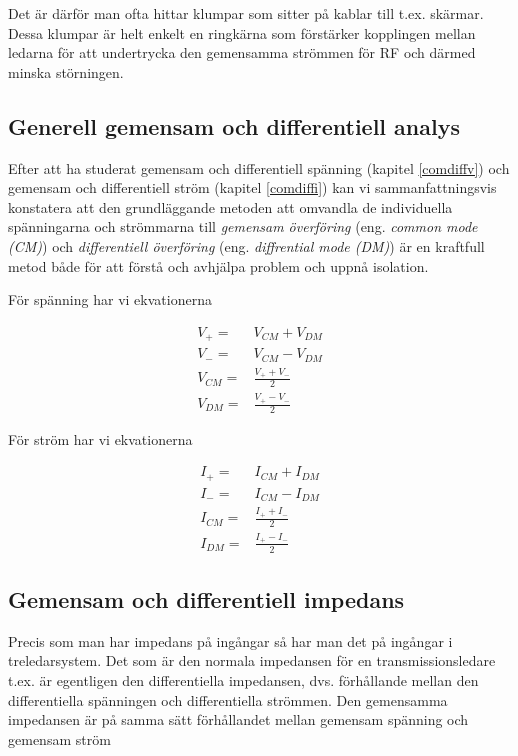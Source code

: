 Det är därför man ofta hittar klumpar som sitter
på kablar till t.ex. skärmar. Dessa klumpar är helt enkelt en ringkärna som
förstärker kopplingen mellan ledarna för att undertrycka den gemensamma strömmen
för RF och därmed minska störningen.

\subsection{Generell gemensam och differentiell analys}
\label{comdiffgeneric}

Efter att ha studerat gemensam och differentiell spänning (kapitel \ref{comdiffv})
och gemensam och differentiell ström (kapitel \ref{comdiffi}) kan vi
sammanfattningsvis konstatera att den grundläggande metoden att omvandla
de individuella spänningarna och strömmarna till \emph{gemensam överföring}
(eng. \emph{common mode (CM)}) och \emph{differentiell överföring}
(eng. \emph{diffrential mode (DM)}) är en kraftfull metod både för att
förstå och avhjälpa problem och uppnå isolation.

För spänning har vi ekvationerna

\begin{eqnarray}
V_+ = & V_{CM} + V_{DM}\\
V_- = & V_{CM} - V_{DM}\\
V_{CM} = & \frac{V_+ + V_-}{2}\\
V_{DM} = & \frac{V_+ - V_-}{2}
\end{eqnarray}

För ström har vi ekvationerna

\begin{eqnarray}
I_+ = & I_{CM} + I_{DM}\\
I_- = & I_{CM} - I_{DM}\\
I_{CM} = & \frac{I_+ + I_-}{2}\\
I_{DM} = & \frac{I_+ - I_-}{2}
\end{eqnarray}

\subsection{Gemensam och differentiell impedans}

Precis som man har impedans på ingångar så har man det på ingångar i
treledarsystem. Det som är den normala impedansen för en transmissionsledare
t.ex. är egentligen den differentiella impedansen, dvs. förhållande mellan den
differentiella spänningen och differentiella strömmen. Den gemensamma impedansen
är på samma sätt förhållandet mellan gemensam spänning och gemensam ström

